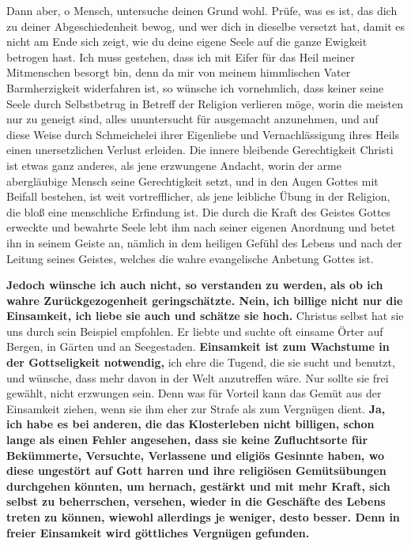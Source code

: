 Dann aber, o Mensch, untersuche deinen Grund wohl. Prüfe, was es ist, das dich
zu deiner Abgeschiedenheit bewog, und wer dich in dieselbe versetzt hat, damit
es nicht am Ende sich zeigt, wie du deine eigene Seele auf die ganze Ewigkeit
betrogen hast. Ich muss gestehen, dass ich mit
Eifer für das Heil meiner
Mitmenschen besorgt bin, denn da mir von meinem himmlischen Vater
Barmherzigkeit widerfahren ist, so wünsche ich vornehmlich, dass keiner seine
Seele durch Selbstbetrug in Betreff der Religion verlieren möge, worin die
meisten nur zu geneigt sind, alles ununtersucht für ausgemacht anzunehmen, und
auf diese Weise durch Schmeichelei ihrer Eigenliebe und Vernachlässigung ihres
Heils einen unersetzlichen Verlust erleiden. Die innere bleibende Gerechtigkeit
Christi ist etwas ganz anderes, als jene erzwungene Andacht, worin der arme
abergläubige Mensch seine Gerechtigkeit setzt, und in den Augen Gottes mit
Beifall bestehen, ist weit vortrefflicher, als jene leibliche Übung in der
Religion, die bloß eine menschliche Erfindung ist. Die durch die Kraft des
Geistes Gottes erweckte und bewahrte Seele lebt ihm nach seiner eigenen
Anordnung und betet ihn in seinem Geiste an, nämlich in dem heiligen Gefühl
des Lebens und nach der Leitung seines Geistes, welches die wahre evangelische
Anbetung Gottes ist.

\medskip

 \textbf{Jedoch wünsche ich auch nicht, so verstanden
zu werden, als ob ich wahre
Zurückgezogenheit geringschätzte. Nein, ich billige nicht nur die Einsamkeit,
ich liebe sie auch und schätze sie hoch.} Christus selbst hat sie uns durch
sein Beispiel empfohlen. Er liebte und suchte oft einsame Örter auf Bergen, in
Gärten und an Seegestaden. \textbf{Einsamkeit ist zum Wachstume in der
Gottseligkeit
notwendig,} ich ehre die Tugend, die sie sucht und benutzt, und wünsche, dass
mehr davon in der Welt anzutreffen wäre. Nur sollte sie frei gewählt, nicht
erzwungen sein. Denn was für Vorteil kann das Gemüt aus der Einsamkeit ziehen,
wenn sie ihm eher zur Strafe als zum Vergnügen dient. \textbf{Ja, ich habe es
bei
anderen, die das Klosterleben  nicht billigen, schon lange
als einen Fehler
angesehen, dass sie keine Zufluchtsorte  für Bekümmerte,
Versuchte, Verlassene
und eligiös Gesinnte haben, wo diese ungestört auf Gott harren und ihre
religiösen Gemütsübungen durchgehen könnten, um hernach, gestärkt und mit mehr
Kraft, sich selbst zu beherrschen, versehen, wieder in die Geschäfte des Lebens
treten zu können, wiewohl allerdings je weniger, desto besser. Denn in freier
Einsamkeit wird göttliches Vergnügen gefunden.}
\label{ref:05_13_zurueckgezogenheit_ende}
